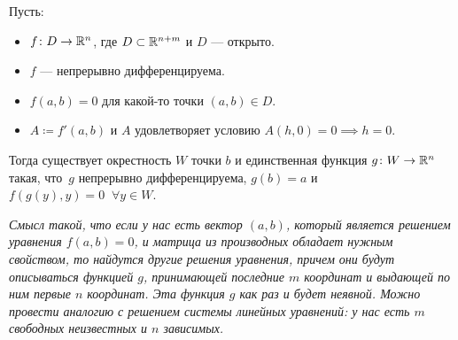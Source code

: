 \begin{theorem} 
    Пусть:
    \begin{itemize}
      \item $f \colon D \to \mathbb{R}^n$, где $D \subset \mathbb{R}^{n + m}$ и $D$ --- открыто.
      \item $f$ --- непрерывно дифференцируема.
      \item $f(a, b) = 0$ для какой-то точки $(a, b) \in D$.
      \item $A \coloneqq f'(a, b)$ и $A$ удовлетворяет условию $A(h, 0) = 0 \implies h = 0$.
    \end{itemize}
    Тогда существует окрестность $W$ точки $b$ и единственная функция $g\colon W \to \mathbb{R}^n$ такая, что~$g$ непрерывно дифференцируема, $g(b) = a$ и $f(g(y), y) = 0\;\; \forall y \in W$. 
    

    \textit{Смысл такой, что если у нас есть вектор $(a, b)$, который является решением уравнения $f(a, b) = 0$, и матрица из производных обладает нужным свойством, то найдутся другие решения уравнения, 
    причем они будут описываться функцией $g$, принимающей последние $m$ координат и выдающей по ним первые $n$ координат.
    Эта функция $g$ как раз и будет неявной.
    Можно провести аналогию с решением системы линейных уравнений: 
    у нас есть $m$ свободных неизвестных и $n$ зависимых.}
\end{theorem}
